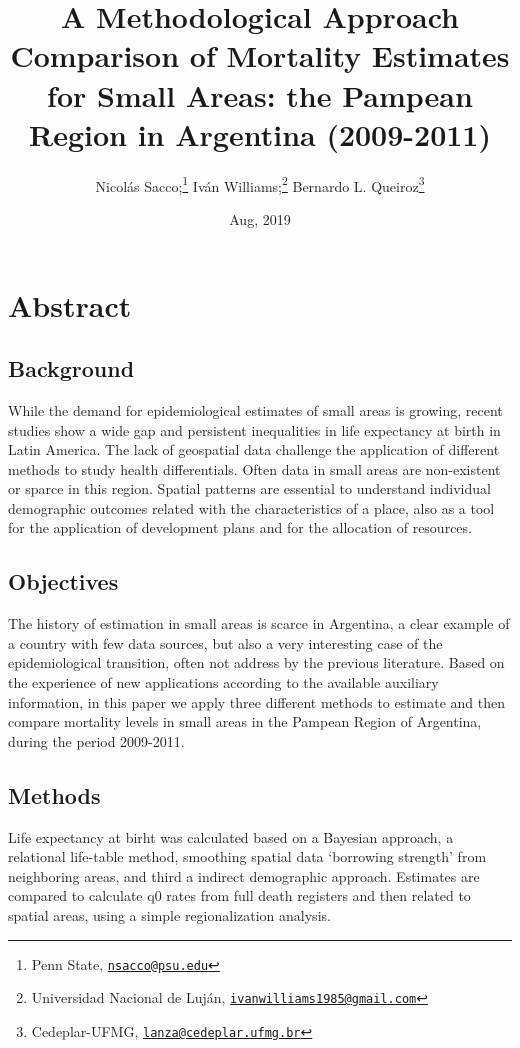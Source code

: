 \documentclass[12pt,]{article}
\title{A Methodological Approach Comparison of Mortality Estimates for Small
Areas: the Pampean Region in Argentina (2009-2011)}
\author{Nicolás Sacco;\footnote{Penn State,
  \href{mailto:nsacco@psu.edu}{\nolinkurl{nsacco@psu.edu}}} Iván
Williams;\footnote{Universidad Nacional de Luján,
  \href{mailto:ivanwilliams1985@gmail.com}{\nolinkurl{ivanwilliams1985@gmail.com}}}
Bernardo L. Queiroz\footnote{Cedeplar-UFMG,
  \href{mailto:lanza@cedeplar.ufmg.br}{\nolinkurl{lanza@cedeplar.ufmg.br}}}}
\date{Aug, 2019}
\begin{document}
\maketitle

\hypertarget{abstract}{%
\section{\texorpdfstring{\textbf{Abstract}}{Abstract}}\label{abstract}}

\hypertarget{background}{%
\subsection{\texorpdfstring{\textbf{Background}}{Background}}\label{background}}

While the demand for epidemiological estimates of small areas is
growing, recent studies show a wide gap and persistent inequalities in
life expectancy at birth in Latin America. The lack of geospatial data
challenge the application of different methods to study health
differentials. Often data in small areas are non-existent or sparce in
this region. Spatial patterns are essential to understand individual
demographic outcomes related with the characteristics of a place, also
as a tool for the application of development plans and for the
allocation of resources.

\hypertarget{objectives}{%
\subsection{\texorpdfstring{\textbf{Objectives}}{Objectives}}\label{objectives}}

The history of estimation in small areas is scarce in Argentina, a clear
example of a country with few data sources, but also a very interesting
case of the epidemiological transition, often not address by the
previous literature. Based on the experience of new applications
according to the available auxiliary information, in this paper we apply
three different methods to estimate and then compare mortality levels in
small areas in the Pampean Region of Argentina, during the period
2009-2011.

\hypertarget{methods}{%
\subsection{\texorpdfstring{\textbf{Methods}}{Methods}}\label{methods}}

Life expectancy at birht was calculated based on a Bayesian approach, a
relational life-table method, smoothing spatial data `borrowing
strength' from neighboring areas, and third a indirect demographic
approach. Estimates are compared to calculate q0 rates from full death
registers and then related to spatial areas, using a simple
regionalization analysis.
\end{document}
